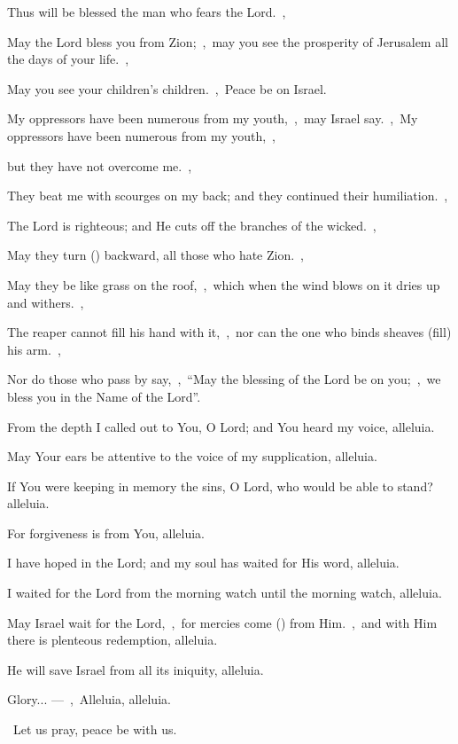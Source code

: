 \documentclass[12pt,twoside,a5paper]{article}
\begin{document}
\begin{halfparskip}
  Thus will be blessed the man who fears the Lord.~\sep

  May the Lord bless you from Zion;~\sep\ may you see the prosperity of Jerusalem all the days of your life.~\sep

  May you see your children's children.~\sep\ Peace be on Israel.

   My oppressors have been numerous from my youth,~\sep\ may Israel say.~\sep\ My oppressors have been numerous from my youth,~\sep

  but they have not overcome me.~\sep

  They beat me with scourges on my back; and they continued their humiliation.~\sep

  The Lord is righteous; and He cuts off the branches of the wicked.~\sep

  May they turn () backward, all those who hate Zion.~\sep

  May they be like grass on the roof,~\sep\ which when the wind blows on it dries up and withers.~\sep

  The reaper cannot fill his hand with it,~\sep\ nor can the one who binds sheaves (fill) his arm.~\sep

  Nor do those who pass by say,~\sep\ ``May the blessing of the Lord be on you;~\sep\ we bless you in the Name of the Lord''.

   From the depth I called out to You, O Lord; and You heard my voice, alleluia.

  May Your ears be attentive to the voice of my supplication, alleluia.

  If You were keeping in memory the sins, O Lord, who would be able to stand? alleluia.

  For forgiveness is from You, alleluia.

  I have hoped in the Lord; and my soul has waited for His word, alleluia.

  I waited for the Lord from the morning watch until the morning watch, alleluia.

  May Israel wait for the Lord,~\sep\ for mercies come () from Him.~\sep\ and with Him there is plenteous redemption, alleluia.

  He will save Israel from all its iniquity, alleluia.

  Glory... ---~\sep\ Alleluia, alleluia.
\end{halfparskip}

\dd~Let us pray, peace be with us.
\end{document}
